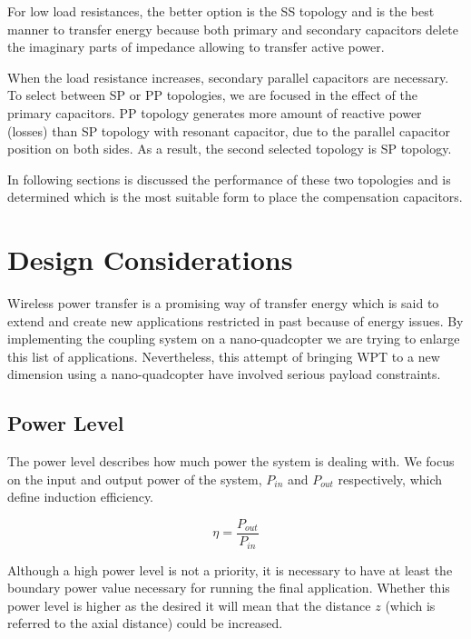 For low load resistances, the better option is the SS topology and is the best manner to transfer energy because both primary and secondary capacitors delete the imaginary parts of impedance allowing to transfer active power. 

When the load resistance increases, secondary parallel capacitors are necessary. To select between SP or PP topologies, we are focused in the effect of the primary capacitors. PP topology generates more amount of reactive power (losses) than SP topology with resonant capacitor, due to the parallel capacitor position on both sides. As a result, the second selected topology is SP topology.

In following sections is discussed the performance of these two topologies and is determined which is the most suitable form to place the compensation capacitors.















	\section{Design Considerations}
Wireless power transfer is a promising way of transfer energy which is said to extend and create new applications restricted in past because of energy issues. By implementing the coupling system on a nano-quadcopter we are trying to enlarge this list of applications. Nevertheless, this attempt of bringing WPT to a new dimension using a nano-quadcopter have involved serious payload constraints.

		\subsection{Power Level}
The power level describes how much power the system is dealing with. We focus on the input and output power of the system, $P_{in}$ and $P_{out}$ respectively, which define induction efficiency. 

\begin{equation}
	\eta = \frac{P_{out}}{P_{in}}
\end{equation}

Although a high power level is not a priority, it is necessary to have at least the boundary power value necessary for running the final application. Whether this power level is higher as the desired it will mean that the distance $z$ (which is referred to the axial distance) could be increased. 

